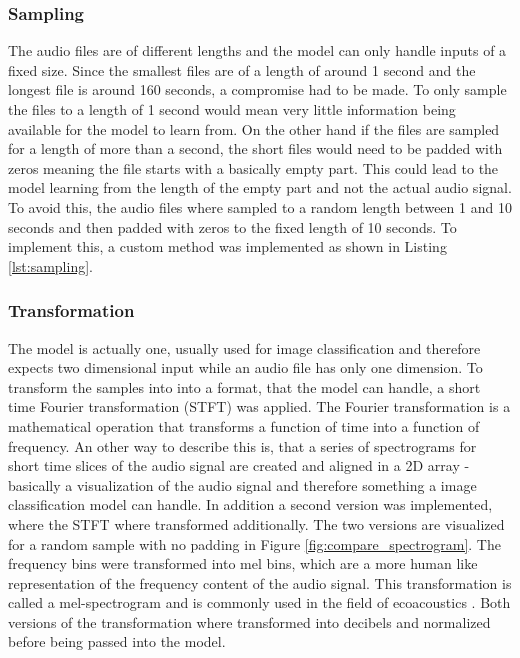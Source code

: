 \subsubsection{Sampling}%
The audio files are of different lengths and the model can only handle inputs of a fixed size.
Since the smallest files are of a length of around 1 second and the longest file is around
160 seconds, a compromise had to be made. To only sample the files to a length of 1 second
would mean very little information being available for the model to learn from. On the other
hand if the files are sampled for a length of more than a second, the short files would need
to be padded with zeros meaning the file starts with a basically empty part. This could lead
to the model learning from the length of the empty part and not the actual audio signal.
To avoid this, the audio files where sampled to a random length between 1 and 10 seconds and
then padded with zeros to the fixed length of 10 seconds. To implement this, a custom method
was implemented as shown in Listing \ref{lst:sampling}.



\subsubsection{Transformation}%
The model is actually one, usually used for image classification and therefore expects
two dimensional input while an audio file has only one dimension. To transform the samples into
into a format, that the model can handle, a short time Fourier transformation  (STFT) was applied.
The Fourier transformation is a mathematical operation that transforms a function of time
into a function of frequency. An other way to describe this is, that a series of spectrograms
for short time slices of the audio signal are created and aligned in a 2D array - basically
a visualization of the audio signal and therefore something a image classification model can handle.
In addition a second version was implemented, where the STFT where transformed additionally.
The two versions are visualized for a random sample with no padding in Figure \ref{fig:compare_spectrogram}.
The frequency bins were transformed into mel bins, which are a more human like representation
of the frequency content of the audio signal. This transformation is called a mel-spectrogram
and is commonly used in the field of ecoacoustics \autocite[7]{stowellComputationalBioacousticsDeep2022}.
Both versions of the transformation where transformed into decibels and normalized before 
being passed into the model.

